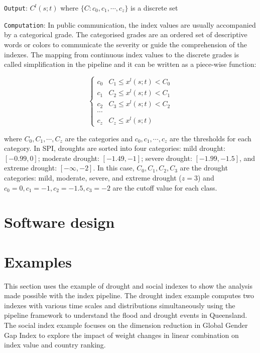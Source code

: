 \documentclass[
]{interact}
\begin{document}
\texttt{Output}: \(C^l(s;t)\) where \(\{C: c_0, c_1, \cdots, c_z\}\) is
a discrete set

\texttt{Computation}: In public communication, the index values are
usually accompanied by a categorical grade. The categorised grades are
an ordered set of descriptive words or colors to communicate the
severity or guide the comprehension of the indexes. The mapping from
continuous index values to the discrete grades is called simplification
in the pipeline and it can be written as a piece-wise function:

\begin{equation}
\begin{cases}
c_0 & C_1 \leq x^l(s; t) < C_0 \\
c_1 & C_2 \leq x^l(s; t) < C_1 \\
c_2 & C_3 \leq x^l(s; t) < C_2 \\
\cdots \\
c_z & C_z \leq x^l(s; t)
\end{cases}
\end{equation}

where \(C_0, C_1,\cdots ,C_z\) are the categories and
\(c_0, c_1, \cdots, c_z\) are the thresholds for each category. In SPI,
droughts are sorted into four categories: mild drought: \([-0.99, 0]\);
moderate drought: \([-1.49, -1]\); severe drought: \([-1.99, -1.5]\),
and extreme drought: \([-\infty, -2]\). In this case,
\(C_0, C_1, C_2, C_3\) are the drought categories: mild, moderate,
severe, and extreme drought (\(z = 3\)) and
\(c_0 =0, c_1 = -1, c_2 = -1.5, c_3 = -2\) are the cutoff value for each
class.

\hypertarget{sec-dev}{%
\section{Software design}\label{sec-dev}}

\hypertarget{sec-examples}{%
\section{Examples}\label{sec-examples}}

This section uses the example of drought and social indexes to show the
analysis made possible with the index pipeline. The drought index
example computes two indexes with various time scales and distributions
simultaneously using the pipeline framework to understand the flood and
drought events in Queensland. The social index example focuses on the
dimension reduction in Global Gender Gap Index to explore the impact of
weight changes in linear combination on index value and country ranking.
\end{document}
